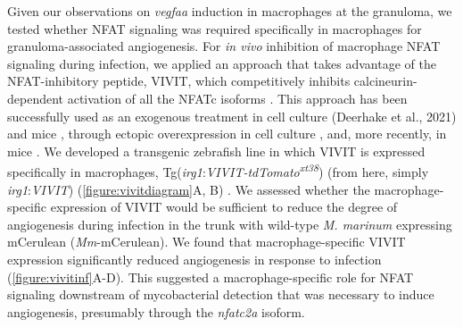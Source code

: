 Given our observations on \textit{vegfaa} induction in macrophages at the granuloma, we tested whether NFAT signaling was required specifically in macrophages for granuloma-associated angiogenesis. For \textit{in vivo} inhibition of macrophage NFAT signaling during infection, we applied an approach that takes advantage of the NFAT-inhibitory peptide, VIVIT, which competitively inhibits calcineurin-dependent activation of all the NFATc isoforms \citep{Aramburu1999}. This approach has been successfully used as an exogenous treatment in cell culture \citep{Deerhake2021} (Deerhake et al., 2021) and mice \citep{Noguchi2004, Elloumi2012, Rojanathammanee2015}, through ectopic overexpression in cell culture \citep{McCullagh2004},  and, more recently, in mice \citep{Poli2022, Peuker2022}. We developed a transgenic zebrafish line in which VIVIT is expressed specifically in macrophages, Tg(\textit{irg1}:\textit{VIVIT-tdTomato\textsuperscript{xt38}}) (from here, simply \textit{irg1}:\textit{VIVIT}) (\autoref{figure:vivitdiagram}A, B) \citep{Sanderson2015}. We assessed whether the macrophage-specific expression of VIVIT would be sufficient to reduce the degree of angiogenesis during infection in the trunk with wild-type \textit{M. marinum} expressing mCerulean (\textit{Mm}-mCerulean). We found that macrophage-specific VIVIT expression significantly reduced angiogenesis in response to infection (\autoref{figure:vivitinf}A-D). This suggested a macrophage-specific role for NFAT signaling downstream of mycobacterial detection that was necessary to induce angiogenesis, presumably through the \textit{nfatc2a} isoform.

